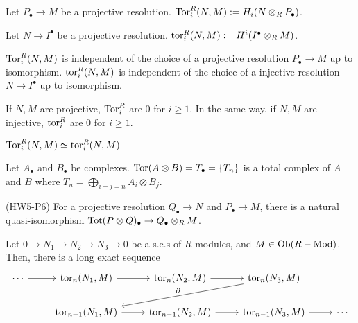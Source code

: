 \documentclass{article}
\begin{document}
\begin{definition}
  Let \(P_\bullet \to M\) be a projective resolution.
  \(\textnormal{Tor}^R_i(N, M) := H_i(N \otimes_R P_\bullet)\).

  Let \(N \to I^\bullet\) be a projective resolution.
  \(\textnormal{tor}^R_i(N, M) := H^i(I^\bullet \otimes_R M)\).
\end{definition}

\begin{lemma}
  \(\textnormal{Tor}^R_i(N, M)\)
  is independent of the choice of a projective resolution
  \(P_\bullet \to M\) up to isomorphism.
  \(\textnormal{tor}^R_i(N, M)\)
  is independent of the choice of a injective resolution
  \(N \to I^\bullet\) up to isomorphism.
\end{lemma}

\begin{theorem}
  If \(N, M\) are projective, \(\textnormal{Tor}^R_i\) are 0 for \(i \ge 1\).
  In the same way, if \(N, M\) are injective, \(\textnormal{tor}^R_i\) are 0 for \(i \ge 1\).
\end{theorem}

\begin{theorem}
  \(\textnormal{Tor}^R_i(N, M) \simeq \textnormal{tor}^R_i(N, M)\)
\end{theorem}

\begin{definition}
  Let \(A_\bullet\) and \(B_\bullet\) be complexes.
  \(\textnormal{Tor}(A \otimes B) = T_\bullet = \{T_n\}\)
  is a total complex of \(A\) and \(B\)
  where \(T_n = \bigoplus_{i+j=n} A_i \otimes B_j\).
\end{definition}

\begin{theorem}(HW5-P6)
  For a projective resolution \(Q_\bullet \to N\)
  and \(P_\bullet \to M\),
  there is a natural quasi-isomorphism
  \(\textnormal{Tot}(P \otimes Q)_\bullet \to Q_\bullet \otimes_R M\).
\end{theorem}

\begin{theorem}
  Let \(0 \to N_1 \to N_2 \to N_3 \to 0\) be a s.e.s of \(R\)-modules,
  and \(M \in \textnormal{Ob}(R-\textnormal{Mod})\).
  Then, there is a long exact sequence
  \[\begin{tikzcd}
    \cdots \ar{r} & \tor_n(N_1, M) \ar{r} & \tor_n(N_2, M) \ar{r} & \tor_n(N_3, M) \ar[swap, "\partial"]{lld} \\
    & \tor_{n-1}(N_1, M) \ar{r} & \tor_{n-1}(N_2, M) \ar{r} & \tor_{n-1}(N_3, M) \ar{r} & \cdots
  \end{tikzcd}\]
\end{theorem}
\end{document}
